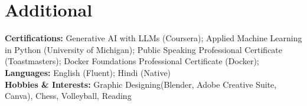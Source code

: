 \documentclass[letterpaper,11pt]{article}
\begin{document}
\section{Additional}
 \begin{itemize}[leftmargin=0.15in, label={}]
    \small{\item{
        \textbf{Certifications:} Generative AI with LLMs (Coursera); Applied Machine Learning in Python (University of Michigan); Public Speaking Professional Certificate (Toastmasters); Docker Foundations Professional Certificate (Docker); \\
        
        \textbf{Languages:} English (Fluent); Hindi (Native) \\
        
        \textbf{Hobbies \& Interests:} Graphic Designing(Blender, Adobe Creative Suite, Canva), Chess, Volleyball, Reading  \\
    }}
 \end{itemize}
\end{document}
